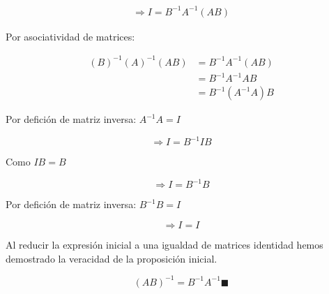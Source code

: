 \begin{gather*}
    \Rightarrow I =B^{-1} A^{-1} \left(AB\right)
\end{gather*}

\vspace*{0.2cm}

Por asociatividad de matrices:

\begin{align*}
    \left(B\right)^{-1} \left(A\right)^{-1} \left(AB\right) & = B^{-1} A^{-1} \left(AB\right) \\
                                                            & =B^{-1} A^{-1} AB               \\
                                                            & =B^{-1} \left(A^{-1} A\right) B
\end{align*}

\vspace*{0.2cm}

Por defición de matriz inversa: $ A^{-1} A = I $

\begin{equation*}
    \Rightarrow I = B^{-1} IB
\end{equation*}

\vspace*{0.2cm}

Como $ IB= B $

\begin{equation*}
    \Rightarrow I = B^{-1} B
\end{equation*}

\vspace*{0.2cm}

Por defición de matriz inversa: $ B^{-1} B = I $

\begin{equation*}
    \Rightarrow I = I
\end{equation*}

\vspace*{0.2cm}

Al reducir la expresión inicial a una igualdad de matrices identidad hemos demostrado la
veracidad de la proposición inicial.

\begin{equation*}
    (AB)^{-1} = B^{-1} A^{-1} \blacksquare
\end{equation*}